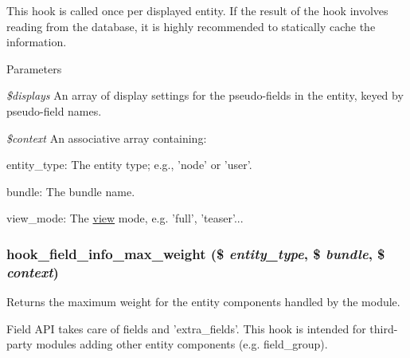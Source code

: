 This hook is called once per displayed entity. If the result of the hook involves reading from the database, it is highly recommended to statically cache the information.


\begin{DoxyParams}{Parameters}
\item[{\em \$displays}]An array of display settings for the pseudo-\/fields in the entity, keyed by pseudo-\/field names. \item[{\em \$context}]An associative array containing:
\begin{DoxyItemize}
\item entity\_\-type: The entity type; e.g., 'node' or 'user'.
\item bundle: The bundle name.
\item view\_\-mode: The \hyperlink{classview}{view} mode, e.g. 'full', 'teaser'... 
\end{DoxyItemize}\end{DoxyParams}
\hypertarget{group__field__storage_gaf1424a5701b90d6e40e505370ba707ce}{
\subsubsection[{hook\_\-field\_\-info\_\-max\_\-weight}]{\setlength{\rightskip}{0pt plus 5cm}hook\_\-field\_\-info\_\-max\_\-weight (\$ {\em entity\_\-type}, \/  \$ {\em bundle}, \/  \$ {\em context})}}
\label{group__field__storage_gaf1424a5701b90d6e40e505370ba707ce}
Returns the maximum weight for the entity components handled by the module.

Field API takes care of fields and 'extra\_\-fields'. This hook is intended for third-\/party modules adding other entity components (e.g. field\_\-group).


